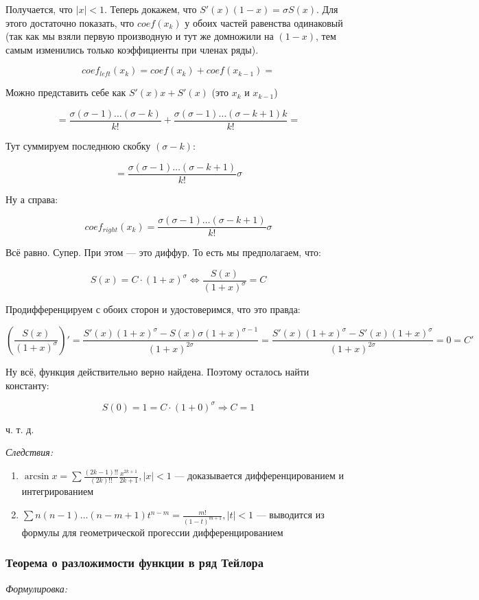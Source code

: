 \documentclass{article}
\begin{document}
Получается, что $|x| < 1$. Теперь докажем, что $S'(x)(1 - x) = \sigma S(x)$. Для этого достаточно показать, что $coef(x_k)$ у обоих частей равенства одинаковый (так как мы взяли первую производную и тут же домножили на $(1 - x)$, тем самым изменились только коэффициенты при членах ряды).

\[coef_{left}(x_k) = coef(x_k) + coef(x_{k - 1}) =\]

Можно представить себе как $S'(x)x + S'(x)$ (это $x_k$ и $x_{k - 1}$)
 
\[= \frac{\sigma(\sigma - 1) \ldots (\sigma - k)}{k!} + \frac{\sigma(\sigma - 1) \ldots (\sigma - k + 1)k}{k!} =\]

Тут суммируем последнюю скобку $(\sigma - k)$:

\[ = \frac{\sigma(\sigma - 1) \ldots (\sigma - k + 1)}{k!}\sigma \]

Ну а справа:

\[coef_{right}(x_k) = \frac{\sigma(\sigma - 1) \ldots (\sigma - k + 1)}{k!}\sigma\]

Всё равно. Супер. При этом --- это диффур. То есть мы предполагаем, что:

\[S(x) = C \cdot (1 + x)^{\sigma} \Leftrightarrow \frac{S(x)}{(1 + x)^{\sigma}} = C\]

Продифференцируем с обоих сторон и удостоверимся, что это правда:

\[\left(\frac{S(x)}{(1 + x)^{\sigma}}\right)' = \frac{S'(x)(1 + x)^{\sigma} - S(x)\sigma(1 + x)^{\sigma - 1}}{(1 + x)^{2\sigma}} = \frac{S'(x)(1 + x)^{\sigma} - S'(x)(1 + x)^{\sigma}}{(1 + x)^{2\sigma}} = 0 = C'\]

Ну всё, функция действительно верно найдена. Поэтому осталось найти константу: 

\[S(0) = 1 = C \cdot (1 + 0)^{\sigma} \Rightarrow C = 1\]

ч. т. д.

\textit{Следствия:}

\begin{enumerate}
    \item $\arcsin x = \sum \frac{(2k - 1)!!}{(2k)!!} \frac{x^{2k + 1}}{2k + 1}, |x| < 1$ --- доказывается дифференцированием и интегрированием
    \item $\sum n(n-1)\ldots(n - m + 1)t^{n - m} = \frac{m!}{(1 - t)^{m + 1}}, |t| < 1$ --- выводится из формулы для геометрической прогессии дифференцированием
\end{enumerate}

\subsubsection{Теорема о разложимости функции в ряд Тейлора}
\textit{Формулировка:}
\end{document}
